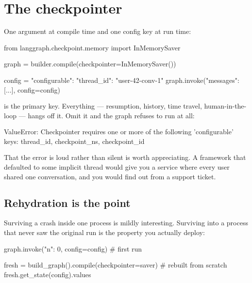 \section{The checkpointer}
\label{sec:checkpointer}

One argument at compile time and one config key at run time:

\begin{python}[caption={Adding persistence}, label={lst:checkpointer}]
from langgraph.checkpoint.memory import InMemorySaver

graph = builder.compile(checkpointer=InMemorySaver())

config = {"configurable": {"thread_id": "user-42-conv-1"}}
graph.invoke({"messages": [...]}, config=config)
\end{python}

 is the primary key. Everything --- resumption, history, time
travel, human-in-the-loop --- hangs off it. Omit it and the graph refuses to run
at all:

\begin{console}
ValueError: Checkpointer requires one or more of the following 'configurable'
keys: thread_id, checkpoint_ns, checkpoint_id
\end{console}

\begin{note}
That the error is loud rather than silent is worth appreciating. A framework that
defaulted to some implicit thread would give you a service where every user
shared one conversation, and you would find out from a support ticket.
\end{note}

\subsection{Rehydration is the point}
\label{sec:rehydration}

Surviving a crash inside one process is mildly interesting. Surviving into a
process that never saw the original run is the property you actually deploy:

\begin{python}[caption={A graph object that has never seen this conversation}, label={lst:rehydrate}]
graph.invoke({"n": 0}, config=config)          # first run

fresh = build_graph().compile(checkpointer=saver)   # rebuilt from scratch
fresh.get_state(config).values
\end{python}

